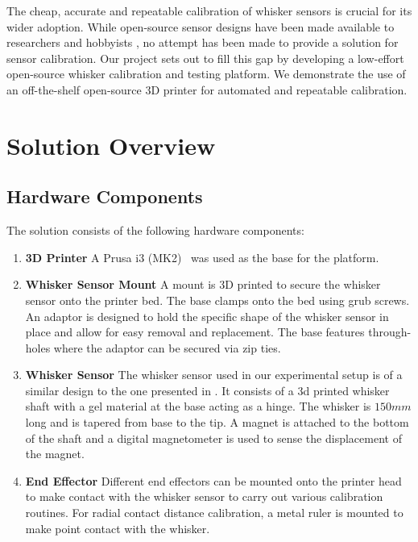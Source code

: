 \documentclass[runningheads]{llncs}
\begin{document}
The cheap, accurate and repeatable calibration of whisker sensors is crucial for its wider adoption. While open-source sensor designs have been made available to researchers and hobbyists \cite{stevenson2024whisker}, no attempt has been made to provide a solution for sensor calibration. Our project sets out to fill this gap by developing a low-effort open-source whisker calibration and testing platform. We demonstrate the use of an off-the-shelf open-source 3D printer for automated and repeatable calibration.

\section{Solution Overview}

\subsection{Hardware Components}

The solution consists of the following hardware components:

\begin{enumerate}
    \item \textbf{3D Printer} A Prusa i3 (MK2)~\cite{OriginalPrusaI3} was used as the base for the platform.

    \item \textbf{Whisker Sensor Mount} A mount is 3D printed to secure the whisker sensor onto the printer bed. The base clamps onto the bed using grub screws. An adaptor is designed to hold the specific shape of the whisker sensor in place and allow for easy removal and replacement. The base features through-holes where the adaptor can be secured via zip ties.

    \item \textbf{Whisker Sensor} The whisker sensor used in our experimental setup is of a similar design to the one presented in \cite{stevenson2024whisker}. It consists of a 3d printed whisker shaft with a gel material at the base acting as a hinge. The whisker is $150 mm$ long and is tapered from base to the tip. A magnet is attached to the bottom of the shaft and a digital magnetometer is used to sense the displacement of the magnet. 

    \item \textbf{End Effector} Different end effectors can be mounted onto the printer head to make contact with the whisker sensor to carry out various calibration routines. For radial contact distance calibration, a metal ruler is mounted to make point contact with the whisker.
\end{enumerate}
\end{document}
